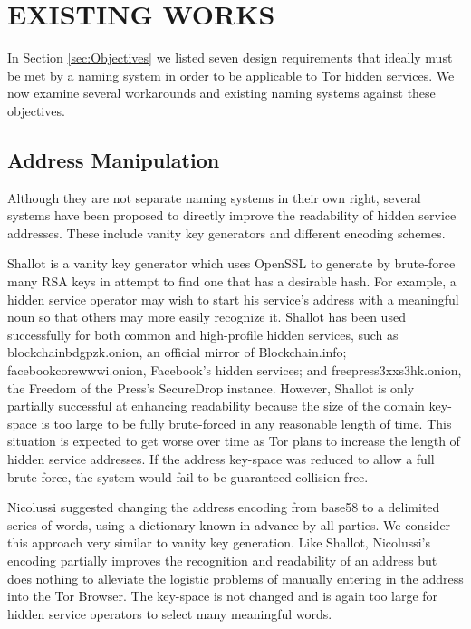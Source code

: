 
\chapter{EXISTING WORKS}
\label{ch:ExistingWorks}

In Section \ref{sec:Objectives} we listed seven design requirements that ideally must be met by a naming system in order to be applicable to Tor hidden services. We now examine several workarounds and existing naming systems against these objectives.

\section{Address Manipulation}

Although they are not separate naming systems in their own right, several systems have been proposed to directly improve the readability of hidden service addresses. These include vanity key generators and different encoding schemes.

Shallot is a vanity key generator which uses OpenSSL to generate by brute-force many RSA keys in attempt to find one that has a desirable hash.\cite{KatmagicShallot} For example, a hidden service operator may wish to start his service's address with a meaningful noun so that others may more easily recognize it. Shallot has been used successfully for both common and high-profile hidden services, such as blockchainbdgpzk.onion, an official mirror of Blockchain.info; facebookcorewwwi.onion, Facebook's hidden services; and  freepress3xxs3hk.onion, the Freedom of the Press's SecureDrop instance. However, Shallot is only partially successful at enhancing readability because the size of the domain key-space is too large to be fully brute-forced in any reasonable length of time.\cite{KatmagicShallot} This situation is expected to get worse over time as Tor plans to increase the length of hidden service addresses.\cite{Proposal224} If the address key-space was reduced to allow a full brute-force, the system would fail to be guaranteed collision-free.

Nicolussi suggested changing the address encoding from base58 to a delimited series of words, using a dictionary known in advance by all parties.\cite{nicolussi2011human} We consider this approach very similar to vanity key generation. Like Shallot, Nicolussi's encoding partially improves the recognition and readability of an address but does nothing to alleviate the logistic problems of manually entering in the address into the Tor Browser. The key-space is not changed and is again too large for hidden service operators to select many meaningful words.

